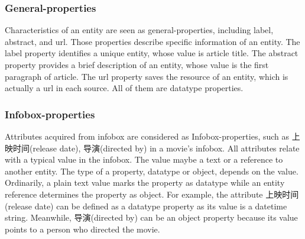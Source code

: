 \documentclass[runningheads,a4paper]{llncs}
\begin{document}
\subsubsection{General-properties}
Characteristics of an entity are seen as general-properties, including label, abstract, and url. Those properties describe specific information of an entity. The label property identifies a unique entity, whose value is article title. The abstract property provides a brief description of an entity, whose value is the first paragraph of article. The url property saves the resource of an entity, which is actually a url in each source. All of them are datatype properties.

\subsubsection{Infobox-properties}
Attributes acquired from infobox are considered as Infobox-properties, such as 上映时间(release date), 导演(directed by) in a movie's infobox. All attributes relate with a typical value in the infobox. The value maybe a text or a reference to another entity. The type of a property, datatype or object, depends on the value. Ordinarily, a plain text value marks the property as datatype while an entity reference determines the property as object. For example, the attribute 上映时间(release date) can be defined as a datatype property as its value is a datetime string. Meanwhile, 导演(directed by) can be an object property because its value points to a person who directed the movie.
\end{document}
